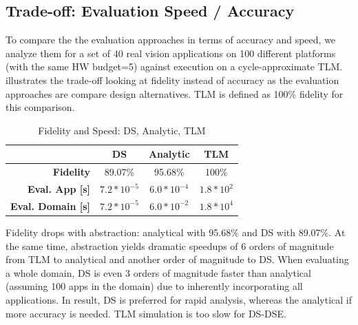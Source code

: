 \subsection{Trade-off: Evaluation Speed / Accuracy }
\label{sec:eva:sum}

To compare the the evaluation approaches in terms of accuracy and speed, we analyze them for a set of 40 real vision applications on 100 different platforms (with the same HW budget=5) against execution on a cycle-approximate TLM. %
 illustrates the trade-off looking at fidelity instead of accuracy as the evaluation approaches are compare design alternatives. TLM is defined as 100\% fidelity for this comparison.

\begin{table}[h]
	\caption{Fidelity and Speed: DS, Analytic, TLM}
	\label{tab:fidelity}
	\begin{tabular}{r||c|c|c}
		\toprule
		  & \textbf{DS}& \textbf{Analytic}& \textbf{TLM}\\
		\hline
		\midrule
		\textbf{Fidelity} & 89.07\%& 95.68\%& 100\%\\
		\hline
		\textbf{Eval. App [s]} & $7.2*10^{-5}$ & $6.0*10^{-4}$ & $1.8*10^2$ \\
		\hline
		\textbf{Eval. Domain [s]} & $7.2*10^{-5}$ & $6.0*10^{-2}$ & $1.8*10^4$ \\
		\bottomrule
	\end{tabular}
\end{table} 

Fidelity drops with abstraction: analytical with 95.68\% and DS with 89.07\%. At the same time, abstraction yields dramatic speedups of 6 orders of magnitude from TLM to analytical and another order of magnitude to DS. When evaluating a whole domain, DS is even 3 orders of magnitude faster than analytical (assuming 100 apps in the domain) due to inherently incorporating all applications. In result, DS is preferred for rapid analysis, whereas the analytical if more accuracy is needed. TLM simulation is too slow for DS-DSE.